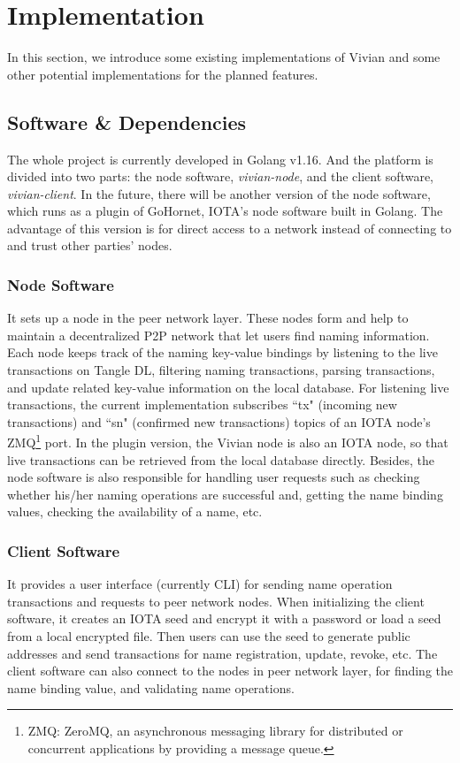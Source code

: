 \section{Implementation}
\label{sec:implementation}

In this section, we introduce some existing implementations of Vivian and some other potential implementations for the planned features.

\subsection{Software \& Dependencies}

The whole project is currently developed in Golang v1.16.
And the platform is divided into two parts: the node software, \textit{vivian-node}, and the client software, \textit{vivian-client}.
In the future, there will be another version of the node software, which runs as a plugin of GoHornet, IOTA's node software built in Golang.
The advantage of this version is for direct access to a network instead of connecting to and trust other parties' nodes.

\subsubsection{Node Software} It sets up a node in the peer network layer. These nodes form and help to maintain a decentralized P2P network that let users find naming information.
Each node keeps track of the naming key-value bindings by listening to the live transactions on Tangle DL, filtering naming transactions, parsing transactions, and update related key-value information on the local database.
For listening live transactions, the current implementation subscribes ``tx" (incoming new transactions) and ``sn" (confirmed new transactions) topics of an IOTA node's ZMQ\footnote{ZMQ: ZeroMQ, an asynchronous messaging library for distributed or concurrent applications by providing a message queue.} port.
In the plugin version, the Vivian node is also an IOTA node, so that live transactions can be retrieved from the local database directly.
Besides, the node software is also responsible for handling user requests such as checking whether his/her naming operations are successful and, getting the name binding values, checking the availability of a name, etc.

\subsubsection{Client Software} It provides a user interface (currently CLI) for sending name operation transactions and requests to peer network nodes.
When initializing the client software, it creates an IOTA seed and encrypt it with a password or load a seed from a local encrypted file.
Then users can use the seed to generate public addresses and send transactions for name registration, update, revoke, etc.
The client software can also connect to the nodes in peer network layer, for finding the name binding value, and validating name operations.

